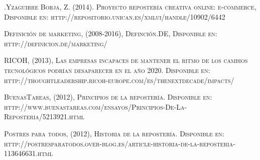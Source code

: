 \documentclass{bmcart}
\begin{document}
\begin{thebibliography}{X}
 \textsc{.Yzaguirre Borja, Z. (2014). Proyecto repostería creativa online: e-commerce, Disponible en: http://repositorio.unican.es/xmlui/handle/10902/6442}

 \textsc{Definición de marketing, (2008-2016), Definción.DE, Disponible en: http://definicion.de/marketing/}

 \textsc{RICOH, (2013), Las empresas incapaces de mantener el ritmo de los cambios tecnológicos podrían desaparecer en el año 2020. Disponible en: http://thoughtleadership.ricoh-europe.com/es/thenextdecade/impacts/}

 \textsc{BuenasTareas, (2012), Principios de la repostería. Disponible en: http://www.buenastareas.com/ensayos/Principios-De-La-Reposteria/5213921.html}

 \textsc{Postres para todos, (2012), Historia de la repostería. Disponible en:  http://postresparatodos.over-blog.es/article-historia-de-la-reposteria-113646631.html}

\end{thebibliography}
\end{document}
